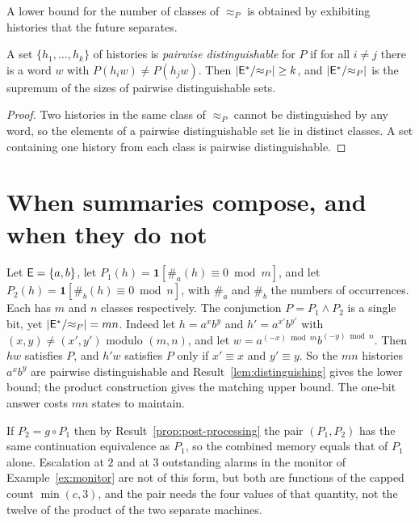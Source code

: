 A lower bound for the number of classes of $\approx_P$ is obtained by exhibiting histories that the future separates.

\begin{established}\label{lem:distinguishing}
A set $\{h_1,\dots,h_k\}$ of histories is \emph{pairwise distinguishable} for $P$ if for all $i\ne j$ there is a word $w$ with $P(h_iw)\ne P(h_jw)$. Then $|\mathsf{E}^{*}/{\approx_P}|\ge k$, and $|\mathsf{E}^{*}/{\approx_P}|$ is the supremum of the sizes of pairwise distinguishable sets.
\end{established}
\begin{proof}
Two histories in the same class of $\approx_P$ cannot be distinguished by any word, so the elements of a pairwise distinguishable set lie in distinct classes. A set containing one history from each class is pairwise distinguishable.
\end{proof}

\section{When summaries compose, and when they do not}

\begin{example}\label{ex:independent-counters}
Let $\mathsf{E}=\{a,b\}$, let $P_1(h)=\mathbf 1[\#_a(h)\equiv0\bmod m]$, and let $P_2(h)=\mathbf 1[\#_b(h)\equiv0\bmod n]$, with $\#_a$ and $\#_b$ the numbers of occurrences. Each has $m$ and $n$ classes respectively. The conjunction $P=P_1\wedge P_2$ is a single bit, yet $|\mathsf{E}^{*}/{\approx_P}|=mn$. Indeed let $h=a^{x}b^{y}$ and $h'=a^{x'}b^{y'}$ with $(x,y)\ne(x',y')$ modulo $(m,n)$, and let $w=a^{(-x)\bmod m}b^{(-y)\bmod n}$. Then $hw$ satisfies $P$, and $h'w$ satisfies $P$ only if $x'\equiv x$ and $y'\equiv y$. So the $mn$ histories $a^xb^y$ are pairwise distinguishable and Result~\ref{lem:distinguishing} gives the lower bound; the product construction gives the matching upper bound. The one-bit answer costs $mn$ states to maintain.
\end{example}

\begin{example}
If $P_2=g\circ P_1$ then by Result~\ref{prop:post-processing} the pair $(P_1,P_2)$ has the same continuation equivalence as $P_1$, so the combined memory equals that of $P_1$ alone. Escalation at $2$ and at $3$ outstanding alarms in the monitor of Example~\ref{ex:monitor} are not of this form, but both are functions of the capped count $\min(c,3)$, and the pair needs the four values of that quantity, not the twelve of the product of the two separate machines.
\end{example}

